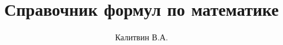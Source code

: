 \documentclass[a4paper, 12pt]{article}
\begin{document}
\author{Калитвин В.А.}
\title{Справочник формул по математике}
\maketitle
\thispagestyle{empty}
\end{document}
